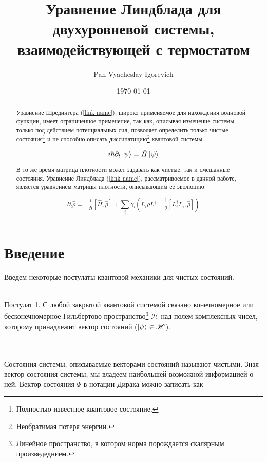 \documentclass[a4paper, 10pt]{article}
\title{Уравнение Линдблада для двухуровневой системы, взаимодействующей с термостатом}
\author{Pan Vyacheslav Igorevich}
\date{\today}
\begin{document}
\maketitle
    \begin{abstract}
        Уравнение Шредингера (\ref{link name}), широко применяемое для нахождения волновой функции, имеет ограниченное применение, 
        так как, описывая изменение системы только под действием потенциальных сил, позволяет определить только чистые 
        состояния\footnote{Полностью известное квантовое состояние.} и не способно описать диссипатицию\footnote{Необратимая потеря энергии.}
        квантовой системы.

        \begin{equation} \label{link name}
            i\hbar\partial_{t} \ket{\psi} = \hat{H}\ket{\psi}
        \end{equation}

        В то же время матрица плотности может задавать как чистые, так и смешанные состояния. Уравнение Линдблада
        (\ref{link name}), рассматривоемое в данной работе, является уравнением матрицы плотности, описывающим ее эволюцию.

        \begin{equation}\label{link name}
            \partial_t \hat{\rho} = -\frac{i}{\hbar} [\hat{H},\hat{\rho}] + \sum_i \gamma_i ( L_{i} \rho L^{\dagger} - \frac{1}{2} [L_{i}^{\dagger} L_i , \hat{\rho}]) 
        \end{equation}

    \end{abstract}

    \section{Введение}
        Введем некоторые постулаты квантовой механики для чистых состояний.
        \\ \\
        \begin{itshape}
            \centering Постулат 1. С любой закрытой квантовой системой связано конечномерное или бесконечномерное 
            Гильбертово пространство\footnote{Линейное пространство, в котором норма порождается скалярным произведеднием.} $\mathscr{H}$ 
            над полем комплексных чисел, 
            которому принадлежит вектор состояний ($\ket{\psi} \in \mathscr{H}$).
        \end{itshape}
        \\ \\
        Состояния системы, описываемые векторами состояний называют чистыми. Зная вектор состояния системы, мы владеем наибольшей возможной 
        информацией о ней.
        Вектор состояния $\Psi$ в нотации Дирака можно записать как 
     
\end{document}
